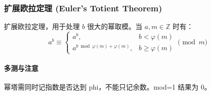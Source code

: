 \subsubsection{扩展欧拉定理 (Euler's Totient Theorem)}
扩展欧拉定理，用于处理 $b$ 很大的幂取模。当 $a, m \in \mathbb{Z}$ 时有：
$$
a^b \equiv \begin{cases} a^b, & b < \varphi(m)\\ a^{b \bmod \varphi(m) + \varphi(m)}, & b\geq \varphi(m)\end{cases} \pmod{m}
$$

\paragraph{多测与注意} 幂塔需同时记指数是否达到 phi，不能只记余数。mod=1 结果为 0。
